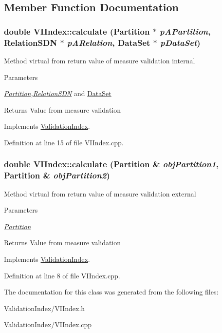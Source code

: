 \subsection{Member Function Documentation}
\hypertarget{classVIIndex_a0d43fc7805b4c05b97cea7c850216f5f}{
\subsubsection[{calculate}]{\setlength{\rightskip}{0pt plus 5cm}double VIIndex::calculate ({\bf Partition} $\ast$ {\em pAPartition}, \/  {\bf RelationSDN} $\ast$ {\em pARelation}, \/  {\bf DataSet} $\ast$ {\em pDataSet})}}
\label{classVIIndex_a0d43fc7805b4c05b97cea7c850216f5f}
Method virtual from return value of measure validation internal 
\begin{DoxyParams}{Parameters}
\item[{\em \hyperlink{classPartition}{Partition},\hyperlink{classRelationSDN}{RelationSDN}}]and \hyperlink{classDataSet}{DataSet} \end{DoxyParams}
\begin{DoxyReturn}{Returns}
Value from measure validation 
\end{DoxyReturn}


Implements \hyperlink{classValidationIndex_a26fe1244f3313bd7f557149f6846fe01}{ValidationIndex}.

Definition at line 15 of file VIIndex.cpp.\hypertarget{classVIIndex_ab097798a95465469bda061fbb57bf101}{
\subsubsection[{calculate}]{\setlength{\rightskip}{0pt plus 5cm}double VIIndex::calculate ({\bf Partition} \& {\em objPartition1}, \/  {\bf Partition} \& {\em objPartition2})}}
\label{classVIIndex_ab097798a95465469bda061fbb57bf101}
Method virtual from return value of measure validation external 
\begin{DoxyParams}{Parameters}
\item[{\em \hyperlink{classPartition}{Partition}}]\end{DoxyParams}
\begin{DoxyReturn}{Returns}
Value from measure validation 
\end{DoxyReturn}


Implements \hyperlink{classValidationIndex_a8b688d8d53fbdacec393730fe2bab614}{ValidationIndex}.

Definition at line 8 of file VIIndex.cpp.

The documentation for this class was generated from the following files:\begin{DoxyCompactItemize}
\item 
ValidationIndex/VIIndex.h\item 
ValidationIndex/VIIndex.cpp\end{DoxyCompactItemize}
